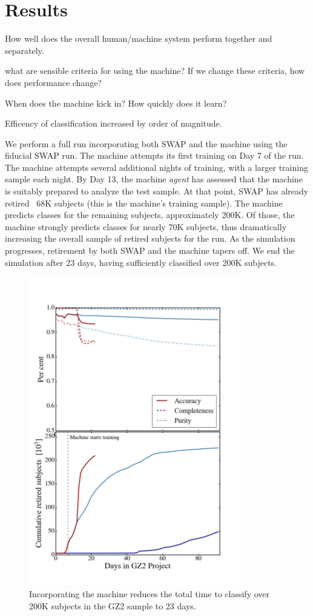 \documentclass[twocolumn]{aastex6}
\begin{document}
\section{Results}
How well does the overall human/machine system perform together and separately. 

what are sensible criteria for using the machine? If we change these criteria, how does performance change? 

When does the machine kick in? How quickly does it learn? 

Efficency of classification increased by order of magnitude. 

We perform a full run incorporating both SWAP and the machine using the fiducial SWAP run.
The machine attempts its first training on Day 7 of the run. The machine attempts several 
additional nights of training, with a larger training sample each night. By Day 13, 
the machine \textit{agent} has assessed that the machine is suitably prepared to 
analyze the test sample. At that point, SWAP has already retired ~68K subjects 
(this is the machine's training sample). The machine predicts classes for the remaining
subjects, approximately 200K. Of those, the machine strongly predicts classes for 
nearly 70K subjects, thus dramatically increasing the overall sample of retired 
subjects for the run. As the simulation progresses, retirement by both SWAP and
the machine tapers off. We end the simulation after 23 days, having sufficiently 
classified over 200K subjects. 

\begin{figure}[t!]
\includegraphics[width=3.65in]{figures/moneyplot.png}
\caption{Incorporating the machine reduces the total time to classify over 200K subjects in the GZ2 sample to 23 days. \label{fig: money}}
\end{figure}
\end{document}
